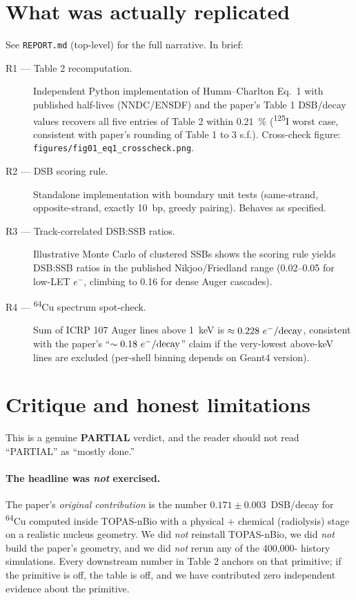 \documentclass[11pt]{article}
\begin{document}
\section{What was actually replicated}
See \texttt{REPORT.md} (top-level) for the full narrative.  In brief:
\begin{description}
  \item[R1 --- Table 2 recomputation.]
    Independent Python implementation of Humm--Charlton Eq.~1 with published
    half-lives (NNDC/ENSDF) and the paper's Table 1 DSB/decay values recovers
    all five entries of Table 2 within \SI{0.21}{\percent}
    (\textsuperscript{125}I worst case, consistent with paper's rounding of
    Table 1 to 3 s.f.).  Cross-check figure:
    \texttt{figures/fig01\_eq1\_crosscheck.png}.
  \item[R2 --- DSB scoring rule.]
    Standalone implementation with boundary unit tests (same-strand,
    opposite-strand, exactly 10~bp, greedy pairing).  Behaves as specified.
  \item[R3 --- Track-correlated DSB:SSB ratios.]
    Illustrative Monte Carlo of clustered SSBs shows the scoring rule yields
    DSB:SSB ratios in the published Nikjoo/Friedland range (0.02--0.05 for
    low-LET $e^-$, climbing to 0.16 for dense Auger cascades).
  \item[R4 --- \textsuperscript{64}Cu spectrum spot-check.]
    Sum of ICRP 107 Auger lines above \SI{1}{keV} is
    $\approx 0.228\ e^-/{\rm decay}$, consistent with the paper's
    ``$\sim 0.18\ e^-/{\rm decay}$'' claim if the very-lowest above-keV lines
    are excluded (per-shell binning depends on Geant4 version).
\end{description}

\section{Critique and honest limitations}
\label{sec:critique}
This is a genuine \textbf{PARTIAL} verdict, and the reader should not read
``PARTIAL'' as ``mostly done.''

\paragraph{The headline was \emph{not} exercised.}
The paper's \emph{original contribution} is the number
$0.171 \pm 0.003$~DSB/decay for \textsuperscript{64}Cu computed inside
TOPAS-nBio with a physical + chemical (radiolysis) stage on a realistic
nucleus geometry.  We did \emph{not} reinstall TOPAS-nBio, we did \emph{not}
build the paper's geometry, and we did \emph{not} rerun any of the 400{,}000-
history simulations.  Every downstream number in Table 2 anchors on that
primitive; if the primitive is off, the table is off, and we have contributed
zero independent evidence about the primitive.
\end{document}
